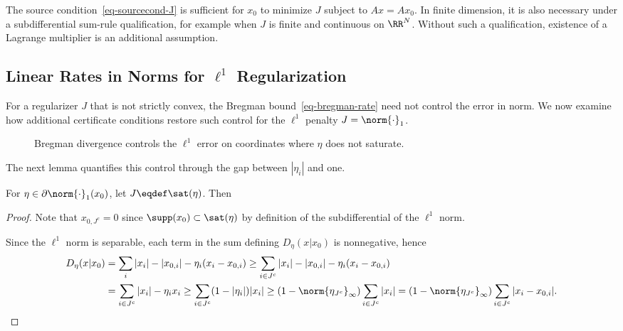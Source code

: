 
The source condition~\eqref{eq-sourcecond-J} is sufficient for $x_0$ to minimize $J$ subject to $Ax=Ax_0$. In finite dimension, it is also necessary under a subdifferential sum-rule qualification, for example when $J$ is finite and continuous on $\RR^N$. Without such a qualification, existence of a Lagrange multiplier is an additional assumption.

                                        
\subsection{Linear Rates in Norms for \texorpdfstring{$\ell^1$}{l1} Regularization}

For a regularizer $J$ that is not strictly convex, the Bregman bound~\eqref{eq-bregman-rate} need not control the error in norm. We now examine how additional certificate conditions restore such control for the $\ell^1$ penalty $J=\norm{\cdot}_1$.

    \begin{figure}[tbp]
\centering
{}
\caption{Bregman divergence controls the $\ell^1$ error on coordinates where $\eta$ does not saturate.}
\label{fig-review-sparse-theory-bregman-l1}
\end{figure}
	
The next lemma quantifies this control through the gap between $|\eta_i|$ and one.

\begin{lem}
	For $\eta \in \partial \norm{\cdot}_1(x_0)$, let $J \eqdef \sat(\eta)$. Then
\end{lem}

\begin{proof}
Note that $x_{0,J^c}=0$ since $\supp(x_0) \subset \sat(\eta)$ by definition of the subdifferential of the $\ell^1$ norm.
 
	Since the $\ell^1$ norm is separable, each term in the sum defining $D_\eta(x|x_0)$ is nonnegative, hence
	\begin{align*}
		D_\eta(x|x_0) &= \sum_i |x_i|-|x_{0,i}|- \eta_i ( x_{i}-x_{0,i} ) 
			\geq \sum_{i \in J^c} |x_i|-|x_{0,i}|- \eta_i ( x_{i}-x_{0,i} ) \\
		&= \sum_{i \in J^c} |x_i|- \eta_i x_{i} \geq \sum_{i \in J^c} (1-|\eta_i|) |x_i|
		\geq (1-\norm{\eta_{J^c}}_\infty) \sum_{i \in J^c} |x_i|
		= (1-\norm{\eta_{J^c}}_\infty) \sum_{i \in J^c} |x_i-x_{0,i}|.
	\end{align*}
\end{proof}

